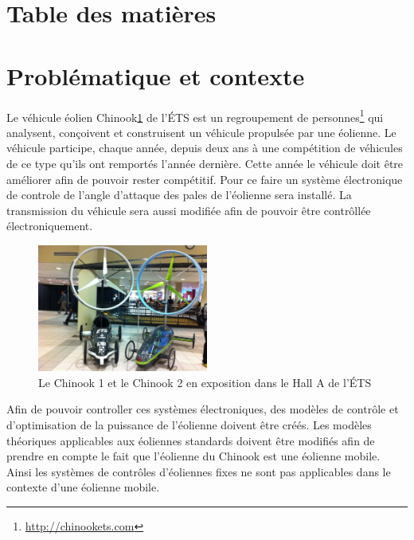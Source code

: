 \documentclass[11pt]{article}
\begin{document}
\section*{Table des matières}

\renewcommand{\contentsname}{Table des matières}
\makeatletter
\renewcommand{\tableofcontents}{%
}
\makeatother

\tableofcontents


\listoffigures
{}


\clearpage

\section{Problématique et contexte}

Le véhicule éolien Chinook\ref{fig:chinookHall} de l'ÉTS est un regroupement de personnes\footnote{\url{http://chinookets.com}} qui analysent, conçoivent et construisent un véhicule propulsée par une éolienne. Le véhicule participe, chaque année, depuis deux ans à une compétition de véhicules de ce type qu'ils ont remportés l'année dernière. Cette année le véhicule doit être améliorer afin de pouvoir rester compétitif. Pour ce faire un système électronique de controle de l'angle d'attaque des pales de l'éolienne sera installé. La transmission du véhicule sera aussi modifiée afin de pouvoir être contrôllée électroniquement. 

\begin{figure}[H]
  \centering
  \includegraphics[width=0.5\textwidth]{images/chinook_1_et_2.jpg}
  \caption[Chinook 1 et 2]{Le Chinook 1 et le Chinook 2 en exposition dans le Hall A de l'ÉTS}
  \label{fig:chinookHall}
\end{figure}

Afin de pouvoir controller ces systèmes électroniques, des modèles de contrôle et d'optimisation de la puissance de l'éolienne doivent être créés. Les modèles théoriques applicables aux éoliennes standards doivent être modifiés afin de prendre en compte le fait que l'éolienne du Chinook est une éolienne mobile. Ainsi les systèmes de contrôles d'éoliennes fixes ne sont pas applicables dans le contexte d'une éolienne mobile.
\end{document}
